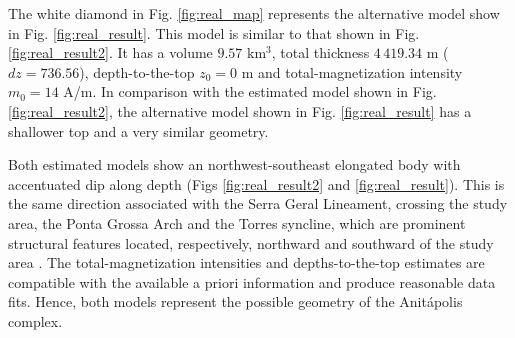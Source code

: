 The white diamond in Fig. \ref{fig:real_map} represents the alternative model 
show in Fig. \ref{fig:real_result}. This model is similar to that shown in 
Fig. \ref{fig:real_result2}. It has a volume $ 9.57 $ km$ ^3 $, total thickness 
$ 4\,419.34 $ m ($ dz = 736.56 $), depth-to-the-top $z_0 = 0$ m and 
total-magnetization intensity $m_0 = 14$ A/m. 
In comparison with the estimated model shown in Fig. \ref{fig:real_result2}, the alternative model 
shown in Fig. \ref{fig:real_result} has a shallower top and a very similar geometry.

Both estimated models show an northwest-southeast elongated body with accentuated dip along depth 
(Figs \ref{fig:real_result2} and \ref{fig:real_result}).
This is the same direction associated with the Serra Geral Lineament, 
crossing the study area, the Ponta Grossa Arch and the Torres syncline,
which are prominent structural features located, respectively, 
northward and southward of the study area \citep[e.g., ][ p. 535]{scheibe-etal2005}.
The total-magnetization intensities and depths-to-the-top estimates are compatible with 
the available a priori information and produce reasonable data fits.
Hence, both models represent the possible geometry of the Anit{\'a}polis complex. 